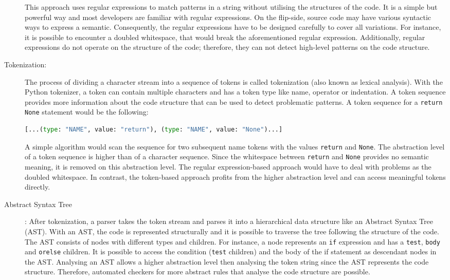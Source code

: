 \begin{description}
    This approach uses regular expressions to match patterns in a string without utilising the structures of the code. It is a simple but powerful way and most developers are familiar with regular expressions. On the flip-side, source code may have various syntactic ways to express a semantic. Consequently, the regular expressions have to be designed carefully to cover all variations. For instance, it is possible to encounter a doubled whitespace, that would break the aforementioned regular expression. Additionally, regular expressions do not operate on the structure of the code; therefore, they can not detect high-level patterns on the code structure.
    \item[Tokenization:] The process of dividing a character stream into a sequence of tokens is called tokenization (also known as lexical analysis). With the Python tokenizer, a token can contain multiple characters and has a token type like name, operator or indentation. A token sequence provides more information about the code structure that can be used to detect problematic patterns. 
    A token sequence for a \texttt{return None} statement would be the following: 
    \begin{lstlisting}[language=Python]
[...(type: "NAME", value: "return"), (type: "NAME", value: "None")...]\end{lstlisting}
    A simple algorithm would scan the sequence for two subsequent name tokens with the values \texttt{return} and \texttt{None}. The abstraction level of a token sequence is higher than of a character sequence. Since the whitespace between \texttt{return} and \texttt{None} provides no semantic meaning, it is removed on this abstraction level. The regular expression-based approach would have to deal with problems as the doubled whitespace. In contrast, the token-based approach profits from the higher abstraction level and can access meaningful tokens directly.
    \item[Abstract Syntax Tree]: After tokenization, a parser takes the token stream and parses it into a hierarchical data structure like an Abstract Syntax Tree (AST). With an AST, the code is represented structurally and it is possible to traverse the tree following the structure of the code. The AST consists of nodes with different types and children. For instance, a node represents an \texttt{if} expression and has a \texttt{test}, \texttt{body} and \texttt{orelse} children. It is possible to access the condition (\texttt{test} children) and the body of the if statement as descendant nodes in the AST. Analysing an AST allows a higher abstraction level then analysing the token string since the AST represents the code structure. Therefore, automated checkers for more abstract rules that analyse the code structure are possible.


\end{description}
